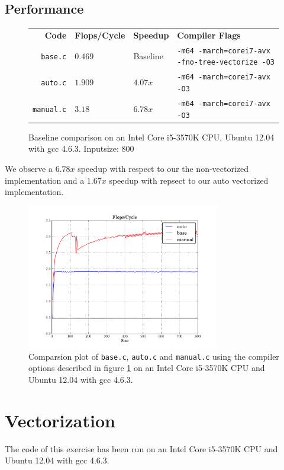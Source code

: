 \documentclass[portrait,a4paper]{article}
\begin{document}
\subsection{Performance}
\begin{figure}[H]
\centering
\begin{tabular}{rlll}
    \textbf{Code} & \textbf{Flops/Cycle} & \textbf{Speedup} & \textbf{Compiler Flags}\\ 
        \texttt{base.c} & $0.469$ & Baseline & \texttt{-m64 -march=corei7-avx -fno-tree-vectorize -O3}\\
    \texttt{auto.c} & $1.909$ & $4.07x$ & \texttt{-m64 -march=corei7-avx -O3}\\
    \texttt{manual.c}& $3.18$ & $6.78x$ & \texttt{-m64 -march=corei7-avx -O3}
\end{tabular}
    \caption{Baseline comparison on an Intel Core i5-3570K CPU, Ubuntu 12.04 with gcc 4.6.3. Inputsize: 800}\label{warmup_performance}
\end{figure}

We observe a $6.78x$ speedup with respect to our the non-vectorized implementation and a $1.67x$ speedup with repsect to our auto vectorized implementation. 

\begin{figure}[H]
    \centering
    \includegraphics[width=0.75\textwidth]{warmup/plot.pdf}
    \caption{Comparsion plot of \lstinline{base.c}, \lstinline{auto.c} and \lstinline{manual.c} using the compiler options described in figure \ref{warmup_performance} on an Intel Core i5-3570K CPU and Ubuntu 12.04 with gcc 4.6.3.}
\end{figure}


\section{Vectorization}
The code of this exercise has been run on an Intel Core i5-3570K CPU and Ubuntu 12.04 with gcc 4.6.3.

\end{document}
